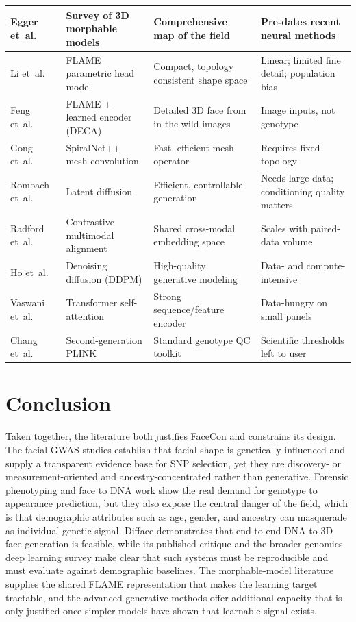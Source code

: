 {\begin{longtable}{|P{2.6cm}|P{3.5cm}|P{4.0cm}|P{3.2cm}|}
Egger et~al.~\cite{ref:egger} & Survey of 3D morphable models & Comprehensive map of the field & Pre-dates recent neural methods \\ \hline
Li et~al.~\cite{ref:flame} & FLAME parametric head model & Compact, topology consistent shape space & Linear; limited fine detail; population bias \\ \hline
Feng et~al.~\cite{ref:deca} & FLAME + learned encoder (DECA) & Detailed 3D face from in-the-wild images & Image inputs, not genotype \\ \hline
Gong et~al.~\cite{ref:spiralnet} & SpiralNet++ mesh convolution & Fast, efficient mesh operator & Requires fixed topology \\ \hline
Rombach et~al.~\cite{ref:ldm} & Latent diffusion & Efficient, controllable generation & Needs large data; conditioning quality matters \\ \hline
Radford et~al.~\cite{ref:clip} & Contrastive multimodal alignment & Shared cross-modal embedding space & Scales with paired-data volume \\ \hline
Ho et~al.~\cite{ref:ddpm} & Denoising diffusion (DDPM) & High-quality generative modeling & Data- and compute-intensive \\ \hline
Vaswani et~al.~\cite{ref:transformer} & Transformer self-attention & Strong sequence/feature encoder & Data-hungry on small panels \\ \hline
Chang et~al.~\cite{ref:plink} & Second-generation PLINK & Standard genotype QC toolkit & Scientific thresholds left to user \\ \hline
\end{longtable}
}

\section{Conclusion}
Taken together, the literature both justifies FaceCon and constrains its design. The facial-GWAS studies establish that facial shape is genetically influenced and supply a transparent evidence base for SNP selection, yet they are discovery- or measurement-oriented and ancestry-concentrated rather than generative. Forensic phenotyping and face to DNA work show the real demand for genotype to appearance prediction, but they also expose the central danger of the field, which is that demographic attributes such as age, gender, and ancestry can masquerade as individual genetic signal. Difface demonstrates that end-to-end DNA to 3D face generation is feasible, while its published critique and the broader genomics deep learning survey make clear that such systems must be reproducible and must evaluate against demographic baselines. The morphable-model literature supplies the shared FLAME representation that makes the learning target tractable, and the advanced generative methods offer additional capacity that is only justified once simpler models have shown that learnable signal exists.

